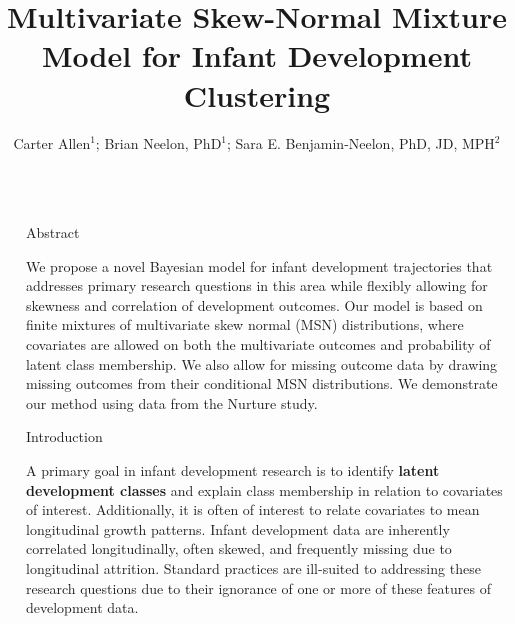 \documentclass[final]{beamer}
\title{Multivariate Skew-Normal Mixture Model for Infant Development Clustering} %
\author{Carter Allen$^1$; Brian Neelon, PhD$^1$; Sara E. Benjamin-Neelon, PhD, JD, MPH$^2$} %
\institute{$^1$Department of Public Health Sciences, Medical University of South Carolina; $^2$Bloomberg School of Public Health, Johns Hopkins University}
\newlength{\sepwid}
\newlength{\onecolwid}
\begin{document}

\setlength{\belowcaptionskip}{2ex} %
\setlength\belowdisplayshortskip{2ex} %

\begin{frame}[t] %

\begin{columns}[t] %

\begin{column}{\sepwid}\end{column} %

\begin{column}{\onecolwid} %


\begin{alertblock}{Abstract}
 
We propose a novel Bayesian model for infant development trajectories that addresses primary research questions in this area while flexibly allowing for skewness and correlation of development outcomes. Our model is based on finite mixtures of multivariate skew normal (MSN) distributions, where covariates are allowed on both the multivariate outcomes and probability of latent class membership. We also allow for missing outcome data by drawing missing outcomes from their conditional MSN distributions. We demonstrate our method using data from the Nurture study.

\end{alertblock}


\begin{block}{Introduction}

A primary goal in infant development research is to identify \textbf{latent development classes} and explain class membership in relation to covariates of interest. Additionally, it is often of interest to relate covariates to mean longitudinal growth patterns. Infant development data are inherently correlated longitudinally, often skewed, and frequently missing due to longitudinal attrition. Standard practices are ill-suited to addressing these research questions due to their ignorance of one or more of these features of development data. 


\end{block}
\end{column}
\end{columns}
\end{frame}
\end{document}
